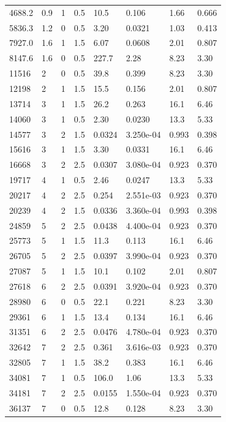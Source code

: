 \documentclass[preview]{standalone}
\begin{document}
{{\begin{tabular}{L{1.2cm}C{1.2cm} C{0.3cm}C{0.5cm} C{1.4cm}C{1.4cm} C{1.4cm}C{1.4cm}}
  4688.2  &   0.9  & 1     & 0.5 &  10.5  & 0.106  & 1.66 &  0.666   \\ 
  5836.3  &   1.2  & 0     & 0.5 &  3.20  & 0.0321  & 1.03 &  0.413   \\ 
  7927.0  &   1.6  & 1     & 1.5 &  6.07  & 0.0608  & 2.01 &  0.807   \\ 
  8147.6  &   1.6  & 0     & 0.5 &  227.7  & 2.28  & 8.23 &  3.30   \\ 
  11516  &     2  & 0     & 0.5 &  39.8  & 0.399  & 8.23 &  3.30   \\ 
  12198  &     2  & 1     & 1.5 &  15.5  & 0.156  & 2.01 &  0.807   \\ 
  13714  &     3  & 1     & 1.5 &  26.2  & 0.263  & 16.1 &  6.46   \\ 
  14060  &     3  & 1     & 0.5 &  2.30  & 0.0230  & 13.3 &  5.33   \\ 
  14577  &     3  & 2     & 1.5 &  0.0324  & 3.250e-04  & 0.993 &  0.398   \\ 
  15616  &     3  & 1     & 1.5 &  3.30  & 0.0331  & 16.1 &  6.46   \\ 
  16668  &     3  & 2     & 2.5 &  0.0307  & 3.080e-04  & 0.923 &  0.370   \\ 
  19717  &     4  & 1     & 0.5 &  2.46  & 0.0247  & 13.3 &  5.33   \\ 
  20217  &     4  & 2     & 2.5 &  0.254  & 2.551e-03  & 0.923 &  0.370   \\ 
  20239  &     4  & 2     & 1.5 &  0.0336  & 3.360e-04  & 0.993 &  0.398   \\ 
  24859  &     5  & 2     & 2.5 &  0.0438  & 4.400e-04  & 0.923 &  0.370   \\ 
  25773  &     5  & 1     & 1.5 &  11.3  & 0.113  & 16.1 &  6.46   \\ 
  26705  &     5  & 2     & 2.5 &  0.0397  & 3.990e-04  & 0.923 &  0.370   \\ 
  27087  &     5  & 1     & 1.5 &  10.1  & 0.102  & 2.01 &  0.807   \\ 
  27618  &     6  & 2     & 2.5 &  0.0391  & 3.920e-04  & 0.923 &  0.370   \\ 
  28980  &     6  & 0     & 0.5 &  22.1  & 0.221  & 8.23 &  3.30   \\ 
  29361  &     6  & 1     & 1.5 &  13.4  & 0.134  & 16.1 &  6.46   \\ 
  31351  &     6  & 2     & 2.5 &  0.0476  & 4.780e-04  & 0.923 &  0.370   \\ 
  32642  &     7  & 2     & 2.5 &  0.361  & 3.616e-03  & 0.923 &  0.370   \\ 
  32805  &     7  & 1     & 1.5 &  38.2  & 0.383  & 16.1 &  6.46   \\ 
  34081  &     7  & 1     & 0.5 &  106.0  & 1.06  & 13.3 &  5.33   \\ 
  34181  &     7  & 2     & 2.5 &  0.0155  & 1.550e-04  & 0.923 &  0.370   \\ 
  36137  &     7  & 0     & 0.5 &  12.8  & 0.128  & 8.23 &  3.30   \\ 
\hline 
\end{tabular} 

}}
\end{document}
